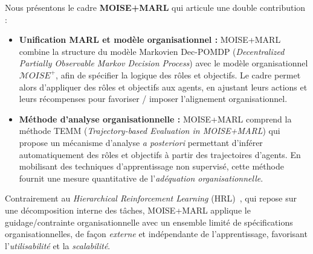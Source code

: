 \documentclass[francais,ROIA,Unicode,manuscript]{cedram}
\begin{document}
\noindent Nous présentons le cadre \textbf{MOISE+MARL} qui articule une double contribution :
%
\begin{itemize}
    \item \textbf{Unification MARL et modèle organisationnel : }
          MOISE+MARL combine la structure du modèle Markovien Dec-POMDP (\textit{Decentralized Partially Observable Markov Decision Process}) avec le modèle organisationnel $\mathcal{M}OISE^+$, afin de spécifier la logique des rôles et objectifs. Le cadre permet alors d'appliquer des rôles et objectifs aux agents, en ajustant leurs actions et leurs récompenses pour favoriser / imposer l’alignement organisationnel.
    \item \textbf{Méthode d'analyse organisationnelle : }
          MOISE+MARL comprend la méthode TEMM (\textit{Trajectory-based Evaluation in MOISE+MARL}) qui propose un mécanisme d’analyse \emph{a posteriori} permettant d’inférer automatiquement des rôles et objectifs à partir des trajectoires d’agents. En mobilisant des techniques d’apprentissage non supervisé, cette méthode fournit une mesure quantitative de l’\emph{adéquation organisationnelle}.
\end{itemize}

\noindent Contrairement au \textit{Hierarchical Reinforcement Learning} (HRL)~\cite{Qi2024,Matsuyama2025}, qui repose sur une décomposition interne des tâches, MOISE+MARL applique le guidage/contrainte organisationnelle avec un ensemble limité de spécifications organisationnelles, de façon \emph{externe} et indépendante de l'apprentissage, favorisant l’\emph{utilisabilité} et la \emph{scalabilité}.
\end{document}
